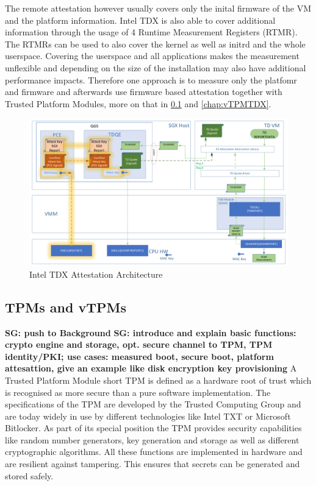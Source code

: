 \documentclass[sigplan,screen,nonacm]{acmart}
\newcommand{\sg}[1]{\textbf{SG: #1}}
\begin{document}
The remote attestation however usually covers only the inital firmware of the VM and the platform information\cite{CA-KVM}.
Intel TDX is also able to cover additional information through the usage of 4 Runtime Measurement Registers (RTMR)\cite{CA-KVM}.
The RTMRs can be used to also cover the kernel as well as initrd and the whole userspace.
Covering the userspace and all applications makes the measurement unflexible and depending on the size of the installation may also have additional performance impacts\cite{CA-KVM}.
Therefore one approach is to measure only the platfomr and firmware and afterwards use firmware based attestation together with Trusted Platform Modules, more on that in \cref{chap:TPM} and \cref{chap:vTPMTDX}.

\begin{figure}
  \centering
  \includegraphics[width=\linewidth]{pictures/Enclaves.png}
  \caption{Intel TDX Attestation Architecture \cite{Intel-QVL}}
  \label{fig:tdxattest}
\end{figure}


\subsection{TPMs and vTPMs}
\label{chap:TPM}
\sg{push to Background}
\sg{introduce and explain basic functions: crypto engine and storage, opt. secure channel to TPM, TPM identity/PKI; use cases: measured boot, secure boot, platform attesattion, give an example like disk encryption key provisioning}
A Trusted Platform Module short TPM is defined as a hardware root of trust which is recognised as more secure than a pure software implementation\cite[p.1]{TPM}.
The specifications of the TPM are developed by the Trusted Computing Group and are today widely in use by different technologies like Intel TXT\cite[p.15]{Intel-TXT} or Microsoft Bitlocker\cite{Bitlocker}.
As part of its special position the TPM provides security capabilities like random number generators, key generation and storage as well as different cryptographic algorithms.
All these functions are implemented in hardware and are resilient against tampering.
This ensures that secrets can be generated and stored safely.
\end{document}

